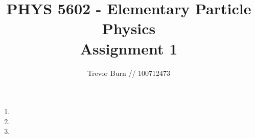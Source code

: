 \documentclass{article}
\title{PHYS 5602 - Elementary Particle Physics \\ Assignment 1}
\author{Trevor Burn // 100712473}
\begin{document}
\maketitle

\begin{enumerate}
	\item 
	\item 
	\item 
\end{enumerate}
\end{document}
